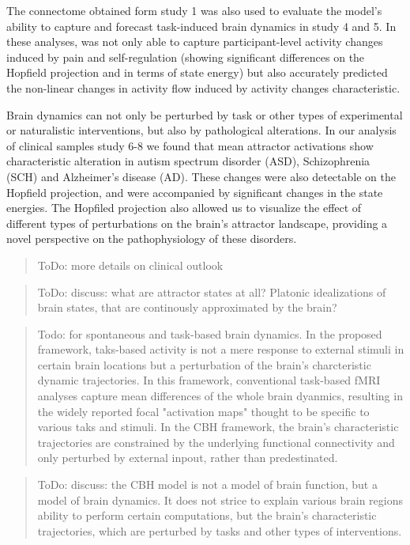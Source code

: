 \documentclass{article}
\begin{document}
The connectome obtained form study 1 was also used to evaluate the model's ability to capture and forecast task-induced brain dynamics in study 4 and 5. In these analyses, was not only able to capture participant-level activity changes induced by pain and self-regulation (showing significant differences on the Hopfield projection and in terms of state energy) but also accurately predicted the non-linear changes in activity flow induced by activity changes characteristic.

Brain dynamics can not only be perturbed by task or other types of experimental or naturalistic interventions, but also by pathological alterations.
In our analysis of clinical samples study 6-8 we found that mean attractor activations show characteristic alteration in autism spectrum disorder (ASD), Schizophrenia (SCH) and Alzheimer's disease (AD). These changes were also detectable on the Hopfield projection, and were accompanied by significant changes in the state energies.
The Hopfiled projection also allowed us to visualize the effect of different types of perturbations on the brain's attractor landscape, providing a novel perspective on the pathophysiology of these disorders.

\begin{quote}
ToDo: more details on clinical outlook
\end{quote}

\begin{quote}
ToDo: discuss: what are attractor states at all? Platonic idealizations of brain states, that are continously approximated by the brain?
\end{quote}

\begin{quote}
Todo: for spontaneous and task-based brain dynamics. In the proposed framework, taks-based activity is not a mere response to external stimuli in certain brain locations but a perturbation of the brain's charcteristic dynamic trajectories. In this framework, conventional task-based fMRI analyses capture mean differences of the whole brain dyanmics, resulting in the widely reported focal "activation maps" thought to be specific to various taks and stimuli. In the CBH framework, the brain's characteristic trajectories are constrained by the underlying functional connectivity and only perturbed by external inpout, rather than predestinated.
\end{quote}

\begin{quote}
ToDo: discuss: the CBH model is not a model of brain function, but a model of brain dynamics. It does not strice to explain various brain regions ability to perform certain computations, but the brain's characteristic trajectories, which are perturbed by tasks and other types of interventions.
\end{quote}
\end{document}
